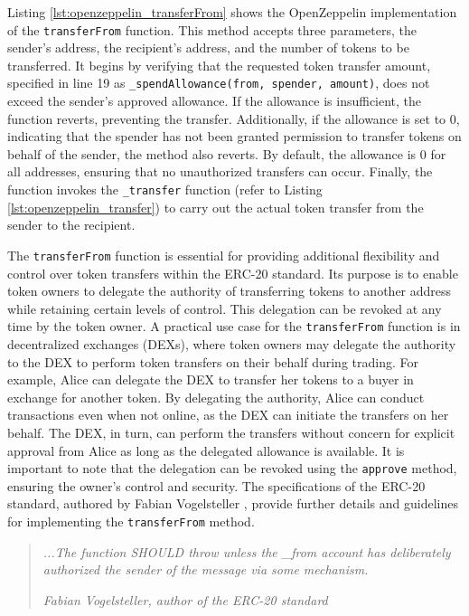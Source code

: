 Listing \ref{lst:openzeppelin_transferFrom} shows the OpenZeppelin implementation of the \texttt{transferFrom} function. This method accepts three parameters, the sender's address, the 
recipient's address, and the number of tokens to be transferred. It begins by verifying that the requested token transfer amount, specified in line 19 as \texttt{\_spendAllowance(from, spender, amount)}, 
does not exceed the sender's approved allowance. If the allowance is insufficient, the function reverts, preventing the transfer. Additionally, if the allowance is set to 0, indicating 
that the spender has not been granted permission to transfer tokens on behalf of the sender, the method also reverts. By default, the allowance is 0 for all addresses, ensuring that no 
unauthorized transfers can occur. Finally, the function invokes the \texttt{\_transfer} function (refer to Listing \ref{lst:openzeppelin_transfer}) to carry out the actual token transfer 
from the sender to the recipient.

The \texttt{transferFrom} function is essential for providing additional flexibility and control over token transfers within the ERC-20 standard. Its purpose is to enable token owners to delegate the authority of transferring tokens to another address while retaining certain levels of control. This delegation can be revoked at any time by the token owner.
A practical use case for the \texttt{transferFrom} function is in decentralized exchanges (DEXs), where token owners may delegate the authority to the DEX to perform token transfers on their behalf during trading. For example, Alice can delegate the DEX to transfer her tokens to a buyer in exchange for another token. By delegating the authority, Alice can conduct transactions even when not online, as the DEX can initiate the transfers on her behalf. The DEX, in turn, can perform the transfers without concern for explicit approval from Alice as long as the delegated allowance is available. It is important to note that the delegation can be revoked using the \texttt{approve} method, ensuring the owner's control and security.
The specifications of the ERC-20 standard, authored by Fabian Vogelsteller \cite{eth_erc20}, provide further details and guidelines for implementing the \texttt{transferFrom} method.

\begin{quote}
    \textit{...The function SHOULD throw unless the \_from account has deliberately authorized the sender of the message via some mechanism.}

    \textit{Fabian Vogelsteller, author of the ERC-20 standard}
\end{quote}

